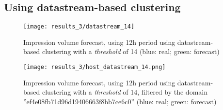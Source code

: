 \subsection*{Using datastream-based clustering}

\begin{figure}[!ht]
\centering
\begin{minipage}[t]{0.45\linewidth}
\texttt{[image: results\_3/datastream\_14]} 
\caption[Volume
impression forecast, domain, cluster by datastream]{Impression volume
forecast, using 12h period using datastream-based clustering with a
\emph{threshold} of 14 (blue: real; green: forecast)}
\label{fig:domain_w_datastream}

\end{minipage}
\quad
\begin{minipage}[t]{0.45\linewidth}
\texttt{[image: results\_3/host\_datastream\_14.png]} 
\caption[Volume
impression forecast, domain, cluster by datastream, filtered]{Impression volume
forecast, using 12h period using datastream-based clustering with a
\emph{threshold} of 14, filtered by the domain ''ef4e08fb71d96d19406663f8bb7ce6c0'' (blue: real; green: forecast)}
\label{fig:domain_w_datastream_filtered}

\end{minipage}

\end{figure}

